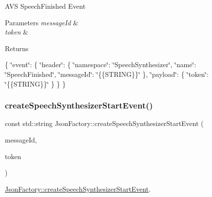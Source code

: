 A\+VS Speech\+Finished Event 
\begin{DoxyParams}{Parameters}
{\em message\+Id} & \\
\hline
{\em token} & \\
\hline
\end{DoxyParams}
\begin{DoxyReturn}{Returns}

\end{DoxyReturn}
\{ \char`\"{}event\char`\"{}\+: \{ \char`\"{}header\char`\"{}\+: \{ \char`\"{}namespace\char`\"{}\+: \char`\"{}\+Speech\+Synthesizer\char`\"{}, \char`\"{}name\char`\"{}\+: \char`\"{}\+Speech\+Finished\char`\"{}, \char`\"{}message\+Id\char`\"{}\+: \char`\"{}\{\{\+S\+T\+R\+I\+N\+G\}\}\char`\"{} \}, \char`\"{}payload\char`\"{}\+: \{ \char`\"{}token\char`\"{}\+: \char`\"{}\{\{\+S\+T\+R\+I\+N\+G\}\}\char`\"{} \} \} \} \mbox{\label{classAVSJson_1_1JsonFactory_a74054bd58dc43cf48d10e4e2b7dd36b8}} 
\subsubsection{\texorpdfstring{create\+Speech\+Synthesizer\+Start\+Event()}{createSpeechSynthesizerStartEvent()}}
{\footnotesize\ttfamily const std\+::string Json\+Factory\+::create\+Speech\+Synthesizer\+Start\+Event (\begin{DoxyParamCaption}\item[{const std\+::string \&}]{message\+Id,  }\item[{const std\+::string \&}]{token }\end{DoxyParamCaption})}



\hyperlink{classAVSJson_1_1JsonFactory_a74054bd58dc43cf48d10e4e2b7dd36b8}{Json\+Factory\+::create\+Speech\+Synthesizer\+Start\+Event}. 

